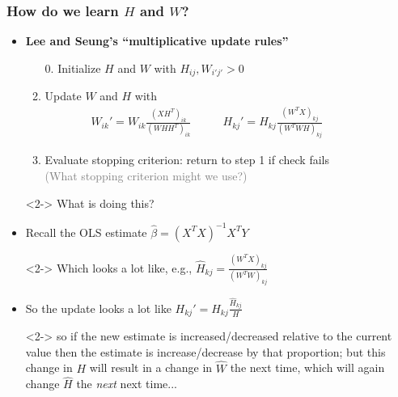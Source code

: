 \documentclass[xcolor={dvipsnames}]{beamer}
\begin{document}
\frame
{
\frametitle{How do we learn $H$ and $W$?}

\begin{itemize}
\item \textbf{Lee and Seung's ``multiplicative update rules''}
\begin{enumerate}
\item[0.]  Initialize $H$ and $W$ with $H_{ij}, W_{i'j'}>0$
\item Update $W$ and $H$ with 
\begin{align*} 
W_{ik}' =  W_{ik} \frac{(X H^T)_{ik}}{(WHH^T)_{ik}} {}& \quad\quad H_{kj}' =  H_{kj} \frac{(W^T X)_{kj}}{(W^TWH)_{kj}}  \quad\quad  \quad\quad 
\end{align*} 
\item Evaluate stopping criterion: return to step 1 if check fails\\
\textcolor{gray}{(What stopping criterion might we use?)}
\end{enumerate}
\item[]
\item[]<2-> What is doing this?
\item<2-> Recall the OLS estimate $\hat \beta = (X^TX)^{-1}X^T Y$
\item[]<2-> Which looks a lot like, e.g., $\hat H_{kj} = \frac{(W^TX)_{kj}}{(W^TW)_{kj}}$
\item<2-> So the update looks a lot like $H_{kj}' = H_{kj} \frac{\hat H_{kj}}{H}$
\item[]<2-> so if the new estimate is increased/decreased relative to the current value 
then the estimate is increase/decrease by that proportion; but this change in $H$ will result in 
a change in $\hat W$ the next time, which will again change $\hat H$ the \emph{next} next time...
\end{itemize}

}
\end{document}
